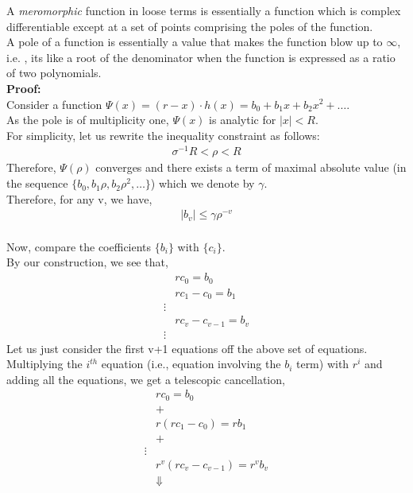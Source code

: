\documentclass[letterpaper]{exam}
\begin{document}
\begin{questions}
\begin{solution}
A \textit{meromorphic} function in loose terms is essentially a function which is complex differentiable except at a set of points comprising the poles of the function. \\
A pole of a function is essentially a value that makes the function blow up to $\infty$, i.e. , its like a root of the denominator when the function is expressed as a ratio of two polynomials.
\\
\textbf{Proof:}\\
Consider a function $\Psi(x) = (r-x)\cdot h(x) = b_0 + b_1x+b_2x^2+ \ldots$.\\
As the pole is of multiplicity one, $\Psi(x)$ is analytic for $\left|x\right| < R$.\\
For simplicity, let us rewrite the inequality constraint as follows:
\begin{align*}
    \sigma^{-1}R < \rho < R
\end{align*}
Therefore, $\Psi(\rho)$ converges and there exists a term of maximal absolute value (in the sequence $\{b_0 , b_1\rho , b_2\rho^2,\ldots \}$) which we denote by $\gamma$.\\
Therefore, for any v, we have,
\begin{align}\label{1}
    \left|b_v\right| \leq \gamma \rho^{-v}
\end{align}
\\
Now, compare the coefficients $\{b_i\}$ with $\{c_i\}$.\\ 
By our construction, we see that,
\begin{align*}
    &rc_0 = b_0\\
    &rc_1 - c_0 = b_1\\
    \vdots\\
    &rc_{v} - c_{v-1} = b_v\\
    \vdots
\end{align*}
Let us just consider the first v+1 equations off the above set of equations.\\
Multiplying the $i^{th}$ equation (i.e., equation involving the $b_i$ term) with $r^{i}$ and adding all the equations, we get a telescopic cancellation,
\begin{align*}
     &rc_0 = b_0\\
     & +\\
    &r(rc_1 - c_0) = rb_1\\
    &+\\
    \vdots\\
    &r^{v}(rc_{v} - c_{v-1}) = r^{v}b_v\\
    &\Downarrow\\

\end{align*}
\end{solution}
\end{questions}
\end{document}
